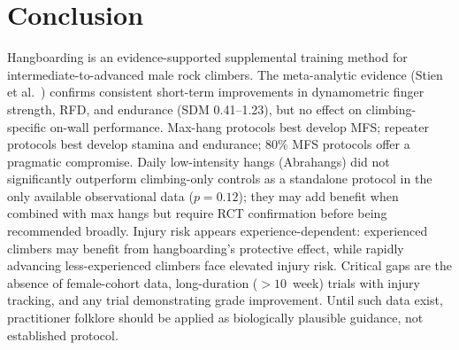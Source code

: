 \section{Conclusion}

Hangboarding is an evidence-supported supplemental training method for intermediate-to-advanced male rock climbers. The meta-analytic evidence (Stien et al.\ \cite{SO23}) confirms consistent short-term improvements in dynamometric finger strength, RFD, and endurance (SDM 0.41--1.23), but no effect on climbing-specific on-wall performance. Max-hang protocols best develop MFS; repeater protocols best develop stamina and endurance; 80\% MFS protocols offer a pragmatic compromise. Daily low-intensity hangs (Abrahangs) did not significantly outperform climbing-only controls as a standalone protocol in the only available observational data ($p = 0.12$); they may add benefit when combined with max hangs but require RCT confirmation before being recommended broadly. Injury risk appears experience-dependent: experienced climbers may benefit from hangboarding's protective effect, while rapidly advancing less-experienced climbers face elevated injury risk. Critical gaps are the absence of female-cohort data, long-duration ($>\!10$~week) trials with injury tracking, and any trial demonstrating grade improvement. Until such data exist, practitioner folklore should be applied as biologically plausible guidance, not established protocol.
